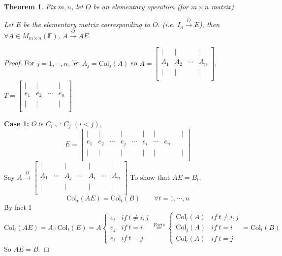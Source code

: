 \documentclass[12pt]{article}
\newtheorem{theorem}{Theorem}[subsection]
\newcommand{\Col}{\mathrm{Col}}
\newcommand{\mF}{{\mathbb{F}}}
\begin{document}
	\begin{theorem}
		Fix $m,n$, let $O$ be an elementary operation (for $m\times n$ matrix).
		
		Let $E$ be the elementary matrix corresponding to $O$. (i.e. 
		$I_n \overset{O}{\longrightarrow} E$), then 
		$\forall A \in M_{m\times n}(\mF)$, $A \overset{O}{\longrightarrow} AE$.
	\end{theorem}
	\begin{proof}
		For $j = 1,\cdots,n$, let $A_j = \Col_j(A)$ so 
		$A = \begin{bmatrix}
			| & | & & |\\
			A_1 & A_2 & \cdots & A_n\\
			| & | & & | \\
		\end{bmatrix}$, 
		$T = 
		\begin{bmatrix}
			| & | & & |\\
			e_1 & e_2 & \cdots & e_n\\
			| & | & & | \\
		\end{bmatrix}$
	
		\textbf{Case 1:}
		$O$ is $C_i \rightleftharpoons C_j$ $(i < j)$, 
		\[
			E = 
			\begin{bmatrix}
				| & | & & | &  & | & | & & & | \\
				e_1 & e_2 & \cdots & e_j & \cdots & e_i & \cdots & e_n\\
				| & | & & | &  & | & | & & & | \\
			\end{bmatrix}
		\]
		Say $A \overset{O}{\longrightarrow} 
		\begin{bmatrix}
			| &  & | & & | & & | \\
			A_1 & \cdots & A_j & \cdots & A_i & \cdots & A_n \\
			| &  & | & & | & & | \\
		\end{bmatrix}$
		To show that $AE = B_t$, 
		\[
			\Col_t(AE) = \Col_t(B) \qquad \forall t = 1,\cdots,n
		\]
		By fact 1
		\[
			\Col_t (AE) = A \cdot \Col_t(E) 
			= A 
			\begin{cases}
				e_t & if \ t \neq i, j\\
				e_j & if \ t = i\\
				e_i & if \ t = j
			\end{cases}
			\overset{Facts}{=}
			\begin{cases}
				\Col_t(A) & if \ t \neq i, j\\
				\Col_j(A) & if \ t = i\\
				\Col_i(A) & if \ t = j
			\end{cases}
			= \Col_t (B)
		\]
		So $AE = B$. 
	\end{proof}
	
\end{document}

